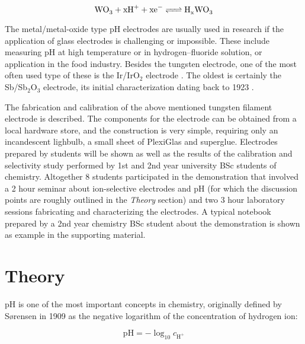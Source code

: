 \documentclass[manuscript=article, journal=jceda8]{achemso}
\begin{document}
\begin{equation}
        \ce{WO_3 + xH^+ + xe^- <=> H_xWO_3}
\end{equation}

The metal/metal-oxide type pH electrodes are usually used in research if the application of glass electrodes is challenging or impossible. These include measuring pH at high temperature or in hydrogen--fluoride solution, or application in the food industry. 
Besides the tungsten electrode, one of the most often used type of these is the Ir/IrO$_2$ electrode \cite{beyenal2004improved}.
The oldest is certainly the Sb/Sb$_2$O$_3$ electrode, its initial characterization dating back to 1923 \cite{uhl1923electrometric}.
%

The fabrication and calibration of the above mentioned tungsten filament electrode is described. The components for the electrode can be obtained from a local hardware store, and the construction is very simple, requiring only an incandescent lighbulb, a small sheet of PlexiGlas and superglue. Electrodes prepared by students will be shown as well as the results of the calibration and selectivity study performed by 1st and 2nd year university BSc students of chemistry. Altogether 8 students participated in the demonstration that involved a 2 hour seminar about ion-selective electrodes and pH (for which the discussion points are roughly outlined in the \emph{Theory} section) and two 3 hour laboratory sessions fabricating and characterizing the electrodes. A typical notebook prepared by a 2nd year chemistry BSc student about the demonstration is shown as example in the supporting material.

\section{Theory}

pH is one of the most important concepts in chemistry, originally defined by S\o rensen in 1909 \cite{sorensen1909messung} as the negative logarithm of the concentration of hydrogen ion:

\begin{equation}
\textrm{pH} = -\log_{10} c_{\textrm{H}^+}
\end{equation}
\end{document}
